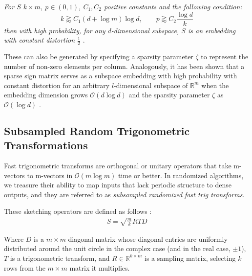 \documentclass{article}
\newcommand{\bO}{\mathcal{O}}
\begin{document}

\textit{For $S$ $k\times m$, $p \in (0, 1)$, $C_1, C_2$ positive constants and the following condition:  
\begin{equation}
    k \gtrapprox  C_1 (d + \log m) \log d, \qquad  p \gtrapprox C_2 \frac{\log d}{k}
\end{equation}
then with high probability, for any $d$-dimensional subspace, $S$ is an embedding with constant distortion $\frac{1}{2}$} \cite{tropp_2023_0na16-j0x38}.

These can also be generated by specifying a sparsity parameter $\zeta$ to represent the number of non-zero elements per column. Analogously, it has been shown that a sparse sign matrix serves as a subspace embedding with high probability with constant distortion for an arbitrary $l$-dimensional subspace of $\mathbb{R}^m$ when the embedding dimension grows $\bO(d \log d)$ and the sparsity parameter $\zeta$ as $\bO(\log d)$ \cite{martinsson2021randomizednumericallinearalgebra}.

\subsection{Subsampled Random Trigonometric Transformations}
Fast trigonometric transforms are orthogonal or unitary operators that take m-vectors to m-vectors in $\bO(m \log m)$ time or better. %
In randomized algorithms, we treasure their ability to map inputs that lack periodic structure to dense outputs, and they are referred to as \textit{subsampled randomized fast trig transforms}.  

These sketching operators are defined as follows \cite{halko2010findingstructurerandomnessprobabilistic}:
\begin{align*}
    S = \sqrt{\frac mk}RTD
\end{align*}

Where $D$ is a $m \times m$ diagonal matrix whose diagonal entries are uniformly distributed around the unit circle in the complex case (and in the real case, $\pm 1$), $T$ is a trigonometric transform, and $R \in \mathbb{R}^{k \times m}$ is a sampling matrix, selecting $k$ rows from the $m \times m$ matrix it multiplies.
\end{document}

